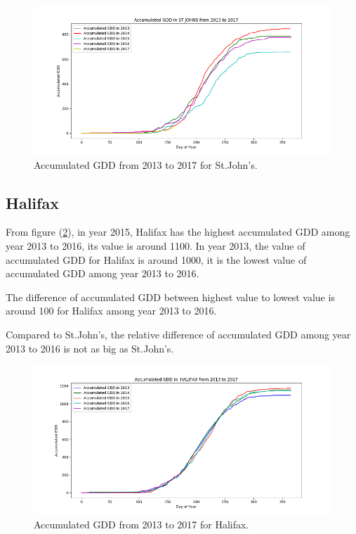 \documentclass[12pt]{article}
\begin{document}
\begin{center}
\begin{figure}[H]
\includegraphics[width=5.25in]{Plot/yearst.png}




\caption{Accumulated GDD from 2013 to 2017 for St.John's.}
\label{5.1}
\end{figure}
\end{center}


\subsection{Halifax}

From figure (\ref{5.2}), in year 2015, Halifax has the highest accumulated GDD among year 2013 to 2016, its value is around 1100. In year 2013, the value of accumulated GDD for Halifax is around 1000, it is the lowest value of accumulated GDD among year 2013 to 2016. 

The difference of accumulated GDD between highest value to lowest value is around 100 for Halifax among year 2013 to 2016.

Compared to St.John's, the relative difference of accumulated GDD among year 2013 to 2016 is not as big as St.John's.
\begin{center}
\begin{figure}[H]
\includegraphics[width=5.25in]{Plot/yearha.png}
\caption{Accumulated GDD from 2013 to 2017 for Halifax.}
\label{5.2}
\end{figure}
\end{center}
\end{document}
